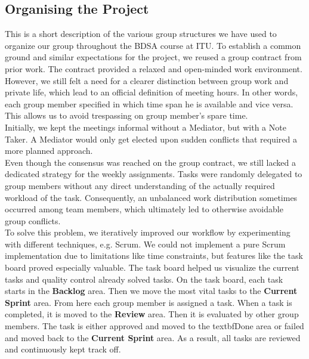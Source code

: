 \subsection{Organising the Project}
This is a short description of the various group structures we have used to organize our group throughout the BDSA course at ITU. To establish a common ground and similar expectations for the project, we reused a group contract from prior work. The contract provided a relaxed and open-minded work environment. However, we still felt a need for a clearer distinction between group work and private life, which lead to an official definition of meeting hours. In other words, each group member specified in which time span he is available and vice versa. This allows us to avoid trespassing on group member's spare time. \\  
Initially, we kept the meetings informal without a Mediator,  but with a Note Taker. A Mediator would only get elected upon sudden conflicts that required a more planned approach. 
\\ Even though the consensus was reached on the group contract, we still lacked a dedicated strategy for the weekly assignments. Tasks were randomly delegated to group members without any direct understanding of the actually required workload of the task. Consequently, an unbalanced work distribution sometimes occurred among team members, which ultimately led to otherwise avoidable group conflicts. 
\\
To solve this problem, we iteratively improved our workflow by experimenting with  different techniques, e.g. Scrum. We could not implement a pure Scrum implementation due to limitations like time constraints, but features like the task board proved especially valuable. The task board helped us visualize the current tasks and quality control already solved tasks. On the task board, each task starts in the \textbf{Backlog} area. Then we move the most vital tasks to the \textbf{Current Sprint} area. From here each group member is assigned a task. When a task is completed, it is moved to the \textbf{Review} area. Then it is evaluated by other group members. The task is either approved and moved to the textbf{Done} area or failed and moved back to the \textbf{Current Sprint} area. As a result, all tasks are reviewed and continuously kept track off. 


